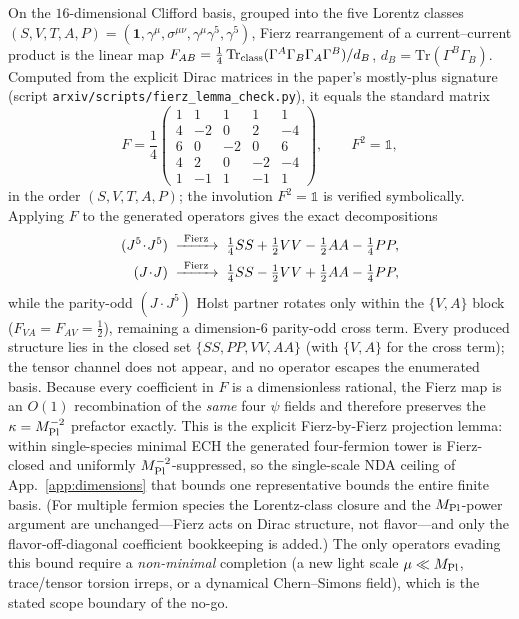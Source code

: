 \documentclass[aps,prd,twocolumn,superscriptaddress,showpacs,preprintnumbers,nofootinbib,longbibliography,floatfix]{revtex4-2}
\begin{document}
On the $16$-dimensional Clifford basis, grouped into the five Lorentz classes
$(S,V,T,A,P)=(\mathbf 1,\gamma^\mu,\sigma^{\mu\nu},\gamma^\mu\gamma^5,\gamma^5)$,
Fierz rearrangement of a current--current product is the linear map
$F_{AB}=\tfrac14\,\mathrm{Tr}_{\rm class}(\Gamma^A\Gamma_B\Gamma_A\Gamma^B)/d_B$,
$d_B=\mathrm{Tr}(\Gamma^B\Gamma_B)$. Computed from the explicit Dirac matrices
in the paper's mostly-plus signature (script
\texttt{arxiv/scripts/fierz\_lemma\_check.py}), it equals the standard
matrix~\cite{ItzyksonZuber,NievesPal2004}
\begin{equation}\label{eq:fierzmatrix}
F=\frac14\!\begin{pmatrix}
1&1&1&1&1\\ 4&-2&0&2&-4\\ 6&0&-2&0&6\\
4&2&0&-2&-4\\ 1&-1&1&-1&1\end{pmatrix},\qquad F^2=\mathbb 1,
\end{equation}
in the order $(S,V,T,A,P)$; the involution $F^2=\mathbb 1$ is verified
symbolically. Applying $F$ to the generated operators gives the exact
decompositions
\begin{align}
(J^5\!\cdot\!J^5)&\;\xrightarrow{\ \rm Fierz\ }\;
\tfrac14 SS+\tfrac12 VV-\tfrac12 AA-\tfrac14 PP,\label{eq:AAdecomp}\\
(J\!\cdot\!J)&\;\xrightarrow{\ \rm Fierz\ }\;
\tfrac14 SS-\tfrac12 VV+\tfrac12 AA-\tfrac14 PP,
\end{align}
while the parity-odd $(J\!\cdot\!J^5)$ Holst partner rotates only within the
$\{V,A\}$ block ($F_{VA}=F_{AV}=\tfrac12$), remaining a dimension-$6$
parity-odd cross term. Every produced structure lies in the closed set
$\{SS,PP,VV,AA\}$ (with $\{V,A\}$ for the cross term); the tensor channel does
not appear, and no operator escapes the enumerated basis. Because every
coefficient in $F$ is a dimensionless rational, the Fierz map is an $O(1)$
recombination of the \emph{same} four $\psi$ fields and therefore preserves the
$\kappa=M_{\rm Pl}^{-2}$ prefactor exactly. This is the explicit Fierz-by-Fierz
projection lemma: within single-species minimal ECH the generated four-fermion
tower is Fierz-closed and uniformly $M_{\rm Pl}^{-2}$-suppressed, so the
single-scale NDA ceiling of App.~\ref{app:dimensions} that bounds one
representative bounds the entire finite basis. (For multiple fermion species the
Lorentz-class closure and the $M_{\rm Pl}$-power argument are unchanged---Fierz
acts on Dirac structure, not flavor---and only the flavor-off-diagonal
coefficient bookkeeping is added.) The only operators evading this bound require
a \emph{non-minimal} completion (a new light scale $\mu\ll M_{\rm Pl}$,
trace/tensor torsion irreps, or a dynamical Chern--Simons field), which is the
stated scope boundary of the no-go.
\end{document}

